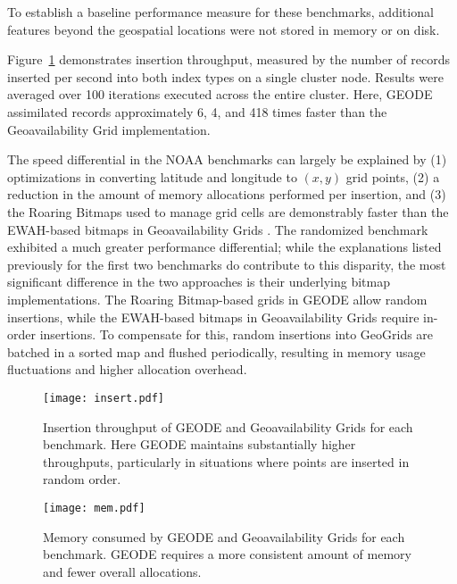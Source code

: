 To establish a baseline performance measure for these benchmarks, additional features beyond the geospatial locations were not stored in memory or on disk.

Figure~\ref{fig:insert} demonstrates insertion throughput, measured by the number of records inserted per second into both index types on a single cluster node. Results were averaged over 100 iterations executed across the entire cluster. Here, GEODE assimilated records approximately 6, 4, and 418 times faster than the Geoavailability Grid implementation.

The speed differential in the NOAA benchmarks can largely be explained by (1) optimizations in converting latitude and longitude to $(x, y)$ grid points, (2) a reduction in the amount of memory allocations performed per insertion, and (3) the Roaring Bitmaps used to manage grid cells are demonstrably faster than the EWAH-based bitmaps in Geoavailability Grids \cite{lemire2016consistently}. The randomized benchmark exhibited a much greater performance differential; while the explanations listed previously for the first two benchmarks do contribute to this disparity, the most significant difference in the two approaches is their underlying bitmap implementations. The Roaring Bitmap-based grids in GEODE allow random insertions, while the EWAH-based bitmaps in Geoavailability Grids require in-order insertions. To compensate for this, random insertions into GeoGrids are batched in a sorted map and flushed periodically, resulting in memory usage fluctuations and higher allocation overhead.

\begin{figure}
    \centerline{\texttt{[image: insert.pdf]}}
    \caption{Insertion throughput of GEODE and Geoavailability Grids for each benchmark. Here GEODE maintains substantially higher throughputs, particularly in situations where points are inserted in random order.}
    \label{fig:insert}
\end{figure}

\begin{figure}
    \centerline{\texttt{[image: mem.pdf]}}
    \caption{Memory consumed by GEODE and Geoavailability Grids for each benchmark. GEODE requires a more consistent amount of memory and fewer overall allocations.}
    \label{fig:mem}
\end{figure}

